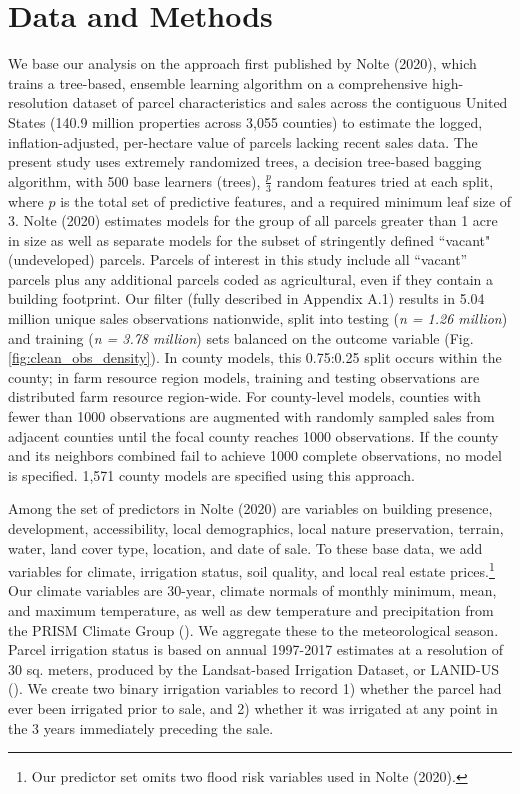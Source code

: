 \documentclass[12pt]{article}
\begin{document}
\section{Data and Methods}
We base our analysis on the approach first published by Nolte (2020), which trains a tree-based, ensemble learning algorithm on a comprehensive high-resolution dataset of parcel characteristics and sales across the contiguous United States (140.9 million properties across 3,055 counties) to estimate the logged, inflation-adjusted, per-hectare value of parcels lacking recent sales data. The present study uses extremely randomized trees, a decision tree-based bagging algorithm, with 500 base learners (trees), $\frac{p}{3}$ random features tried at each split, where $p$ is the total set of predictive features, and a required minimum leaf size of 3. Nolte (2020) estimates models for the group of all parcels greater than 1 acre in size as well as separate models for the subset of stringently defined ``vacant" (undeveloped) parcels. Parcels of interest in this study include all ``vacant'' parcels plus any additional parcels coded as agricultural, even if they contain a building footprint. Our filter (fully described in Appendix A.1) results in 5.04 million unique sales observations nationwide, split into testing (\textit{n = 1.26 million}) and training (\textit{n = 3.78 million}) sets balanced on the outcome variable (Fig. \ref{fig:clean_obs_density}). In county models, this 0.75:0.25 split occurs within the county; in farm resource region models, training and testing observations are distributed farm resource region-wide. For county-level models, counties with fewer than 1000 observations are augmented with randomly sampled sales from adjacent counties until the focal county reaches 1000 observations. If the county and its neighbors combined fail to achieve 1000 complete observations, no model is specified. 1,571 county models are specified using this approach.

Among the set of predictors in Nolte (2020) are variables on building presence, development, accessibility, local demographics, local nature preservation, terrain, water, land cover type, location, and date of sale. To these base data, we add variables for climate, irrigation status, soil quality, and local real estate prices.\footnote{Our predictor set omits two flood risk variables used in Nolte (2020).} Our climate variables are 30-year, climate normals of monthly minimum, mean, and maximum temperature, as well as dew temperature and precipitation from the PRISM Climate Group (\cite{PRISMClimate2021}). We aggregate these to the meteorological season. Parcel irrigation status is based on annual 1997-2017 estimates at a resolution of 30 sq. meters, produced by the Landsat-based Irrigation Dataset, or LANID-US (\cite{Xie2021MappingStates}). We create two binary irrigation variables to record 1) whether the parcel had ever been irrigated prior to sale, and 2) whether it was irrigated at any point in the 3 years immediately preceding the sale. 
\end{document}
